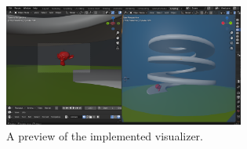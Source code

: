 \begin{figure}[h] 
	\centering \includegraphics[height=4cm]{./images/visualization.png}
	\caption{A preview of the implemented visualizer.}
	\label{viz}
\end{figure}


